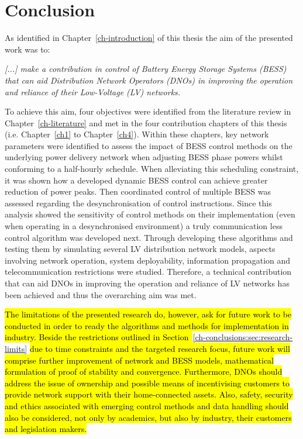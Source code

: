 \section{Conclusion}
\label{ch-conclusions:sec:conclusion}

As identified in Chapter~\ref{ch-introduction} of this thesis the aim of the presented work was to:

\textit{[...] make a contribution in control of Battery Energy Storage Systems (BESS) that can aid Distribution Network Operators (DNOs) in improving the operation and reliance of their Low-Voltage (LV) networks.}

To achieve this aim, four objectives were identified from the literature review in Chapter~\ref{ch-literature} and met in the four contribution chapters of this thesis (i.e. Chapter~\ref{ch1} to Chapter~\ref{ch4}).
Within these chapters, key network parameters were identified to assess the impact of BESS control methods on the underlying power delivery network when adjusting BESS phase powers whilst conforming to a half-hourly schedule.
When alleviating this scheduling constraint, it was shown how a developed dynamic BESS control can achieve greater reduction of power peaks.
Then coordinated control of multiple BESS was assessed regarding the desynchronisation of control instructions.
Since this analysis showed the sensitivity of control methods on their implementation (even when operating in a desynchronised environment) a truly communication less control algorithm was developed next.
Through developing these algorithms and testing them by simulating several LV distribution network models, aspects involving network operation, system deployability, information propagation and telecommunication restrictions were studied.
Therefore, a technical contribution that can aid DNOs in improving the operation and reliance of LV networks has been achieved and thus the overarching aim was met.

\hl{The limitations of the presented research do, however, ask for future work to be conducted in order to ready the algorithms and methods for implementation in industry.
Beside the restrictions outlined in Section~}\ref{ch-conclusions:sec:research-limits}\hl{ due to time constraints and the targeted research focus, future work will comprise further improvement of network and BESS models, mathematical formulation of proof of stability and convergence.
Furthermore, DNOs should address the issue of ownership and possible means of incentivising customers to provide network support with their home-connected assets.
Also, safety, security and ethics associated with emerging control methods and data handling should also be considered, not only by academics, but also by industry, their customers and legislation makers.}

